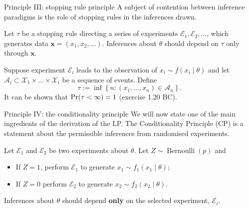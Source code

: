 \begin{frame}{Principle III: stopping rule principle}
A subject of contention between inference paradigms is the role of stopping rules in the inferences drawn.
\begin{idea}
\label{idea:SRP}
Let $\tau$ be a stopping rule directing a series of experiments $\mathcal{E}_1, \mathcal{E}_2, \ldots$, which generates data $\boldsymbol{x} = (x_1, x_2, \ldots)$.
Inferences about $\theta$ should depend on $\tau$ only through $\boldsymbol{x}$.
\end{idea}
\begin{example}
 Suppose experiment $\mathcal{E}_i$ leads to the observation of $x_i \sim f(x_i \mid \theta)$ and let $\mathcal{A}_i \subset \mathcal{X}_1 \times \ldots \times \mathcal{X}_i$ be a sequence of events.
 Define 
 $$ \tau := \inf \left\{ n : (x_1, \ldots, x_n) \in \mathcal{A}_n \right\}.$$
 It can be shown that $\operatorname{Pr}(\tau < \infty) = 1$ (exercise 1.20 BC). 
\end{example}
\end{frame}
\begin{frame}{Principle IV: the conditionality principle}
We will now state one of the main ingredients of the derivation of the LP.
The Conditionality Principle (CP) is a statement about the permissible inferences from randomised experiments.
\begin{idea}
\label{idea:CP}
 Let $\mathcal{E}_1$ and $\mathcal{E}_2$ be two experiments about $\theta$.
 Let $Z \sim \operatorname{Bernoulli}(p)$ and 
 \begin{itemize}
  \item If $Z=1$, perform $\mathcal{E}_1$ to generate $x_1 \sim f_1(x_1 \mid \theta)$;
  \item If $Z=0$ perform $\mathcal{E}_2$ to generate $x_2 \sim f_2(x_2 \mid \theta)$.
 \end{itemize}
Inferences about $\theta$ should depend \textbf{only} on the selected experiment, $\mathcal{E}_i$.
\end{idea}
\end{frame}
